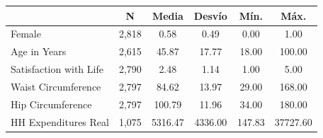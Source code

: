 {
\def\sym#1{\ifmmode^{#1}\else\(^{#1}\)\fi}
\begin{tabular}{l*{1}{ccccc}}
\toprule
                    &           N&       Media&      Desvío&        Mín.&        Máx.\\
\midrule
Female              &       2,818&        0.58&        0.49&        0.00&        1.00\\
Age in Years        &       2,615&       45.87&       17.77&       18.00&      100.00\\
Satisfaction with Life&       2,790&        2.48&        1.14&        1.00&        5.00\\
Waist Circumference &       2,797&       84.62&       13.97&       29.00&      168.00\\
Hip Circumference   &       2,797&      100.79&       11.96&       34.00&      180.00\\
HH Expenditures Real&       1,075&     5316.47&     4336.00&      147.83&    37727.60\\
\bottomrule
\end{tabular}
}
